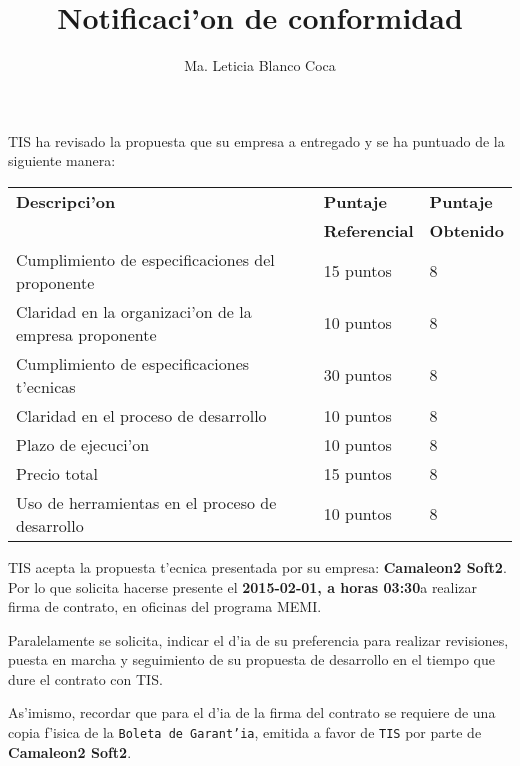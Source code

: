 \documentclass[10pt,letterpaper,twoside]{article}
\newcommand{\empresa}[0]{\textbf{Camaleon2 Soft2}}
\newcommand{\diayhora}[0]{\textbf{2015-02-01, a horas 03:30}}
\newcommand{\pp}[0]{8}
\newcommand{\sep}[0]{8}
\newcommand{\tp}[0]{8}
\newcommand{\cp}[0]{8}
\newcommand{\qp}[0]{8}
\newcommand{\ssp}[0]{8}
\newcommand{\sssp}[0]{8}
\begin{document}
\title{Notificaci'on de conformidad}
\author{Ma. Leticia Blanco Coca}
\maketitle

TIS ha revisado la propuesta que su empresa a entregado y se ha puntuado de la siguiente manera:

\begin{tabular}{|l|l|l|}
\hline \textbf{Descripci'on}& \textbf{Puntaje}&\textbf{Puntaje} \\
& \textbf{Referencial}&\textbf{Obtenido} \\
\hline
\hline Cumplimiento de especificaciones del proponente       & 15 puntos & \pp \\
\hline Claridad en la organizaci'on de la empresa proponente & 10 puntos & \sep \\
\hline Cumplimiento de especificaciones t'ecnicas            & 30 puntos & \tp \\ 
\hline Claridad en el proceso de desarrollo                  & 10 puntos & \cp\\
\hline Plazo de ejecuci'on                                   & 10 puntos & \qp \\
\hline Precio total                                          & 15 puntos & \ssp \\
\hline Uso de herramientas en el proceso de desarrollo       & 10 puntos & \sssp \\
\hline
\end{tabular}

TIS acepta la propuesta t'ecnica presentada por su empresa: \empresa. Por lo que solicita hacerse presente el \diayhora a realizar firma de contrato, en oficinas del programa MEMI.

Paralelamente se solicita, indicar el d'ia de su preferencia para realizar revisiones, puesta en marcha  y seguimiento de su propuesta de desarrollo en el tiempo que dure el contrato con TIS.

As'imismo, recordar que para el d'ia de la firma del contrato se requiere de una copia f'isica de la \texttt{Boleta de Garant'ia}, emitida a favor de \texttt{TIS} por parte de \empresa.
\end{document}
